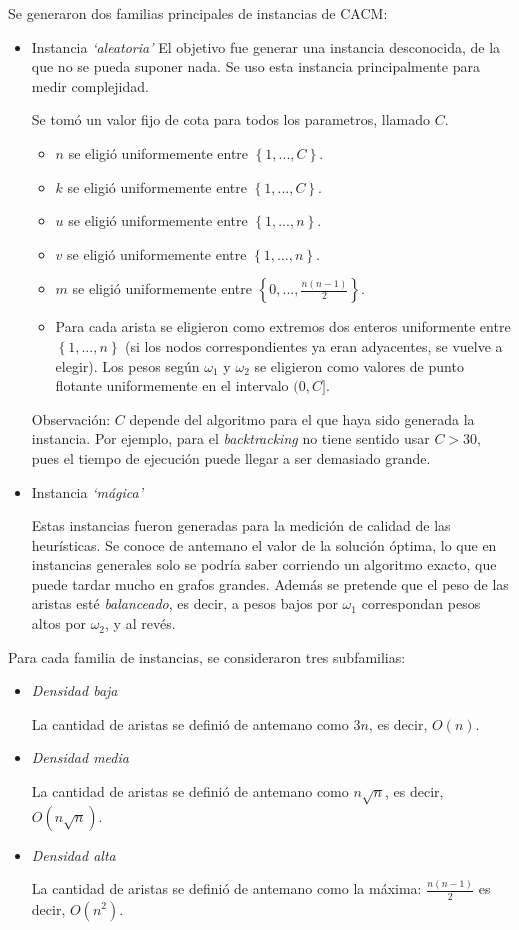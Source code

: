 Se generaron dos familias principales de instancias de CACM:

\begin{itemize}
    \item Instancia \textit{`aleatoria'}
El objetivo fue generar una instancia desconocida, de la que no se pueda suponer nada. Se uso esta instancia principalmente para medir complejidad.

Se tomó un valor fijo de cota para todos los parametros, llamado $C$.

\begin{itemize}
    \item $n$ se eligió uniformemente entre $\left\{{1, ..., C}\right\}$.
    \item $k$ se eligió uniformemente entre $\left\{{1, ..., C}\right\}$.
    \item $u$ se eligió uniformemente entre $\left\{{1, ..., n}\right\}$.
    \item $v$ se eligió uniformemente entre $\left\{{1, ..., n}\right\}$.
    \item $m$ se eligió uniformemente entre $\left\{{0, ..., \frac{n(n-1)}{2}}\right\}$.
    \item Para cada arista se eligieron como extremos dos enteros uniformente entre $\left\{{1, ..., n}\right\}$ (si los nodos correspondientes ya eran adyacentes, se vuelve a elegir). Los pesos según $\omega_1$ y $\omega_2$ se eligieron como valores de punto flotante uniformemente en el intervalo $(0, C]$.
\end{itemize}
Observación: $C$ depende del algoritmo para el que haya sido generada la instancia. Por ejemplo, para el \textit{backtracking} no tiene sentido usar $C > 30$, pues el tiempo de ejecución puede llegar a ser demasiado grande.

    \item Instancia \textit{`mágica'}

Estas instancias fueron generadas para la medición de calidad de las heurísticas. Se conoce de antemano el valor de la solución óptima, lo que en instancias generales solo se podría saber corriendo un algoritmo exacto, que puede tardar mucho en grafos grandes. Además se pretende que el peso de las aristas esté \textit{balanceado}, es decir, a pesos bajos por $\omega_1$ correspondan pesos altos por $\omega_2$, y al revés.
\end{itemize}

Para cada familia de instancias, se consideraron tres subfamilias:

\begin{itemize}
    \item \textit{Densidad baja}

    La cantidad de aristas se definió de antemano como $3n$, es decir, $O(n)$.
    \item \textit{Densidad media}

    La cantidad de aristas se definió de antemano como $n\sqrt{n}$, es decir, $O(n\sqrt{n})$.
    \item \textit{Densidad alta}

    La cantidad de aristas se definió de antemano como la máxima: $\frac{n(n-1)}{2}$ es decir, $O(n^2)$.
\end{itemize}

